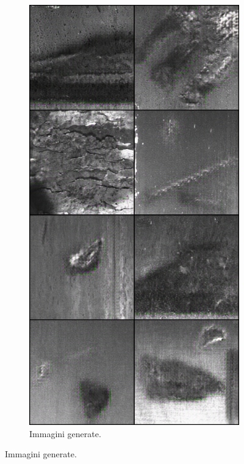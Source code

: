 \begin{figure}[htbp]
    \hfill
    \begin{subfigure}[b]{0.3\textwidth}
        \includegraphics[width=\textwidth]{imgs/Coigan/results/artifacts/media_images_fake_image_60500_b51fd0e318bb0b991db0.png}
        \caption{Immagini generate.}

\end{subfigure}
\end{figure}
